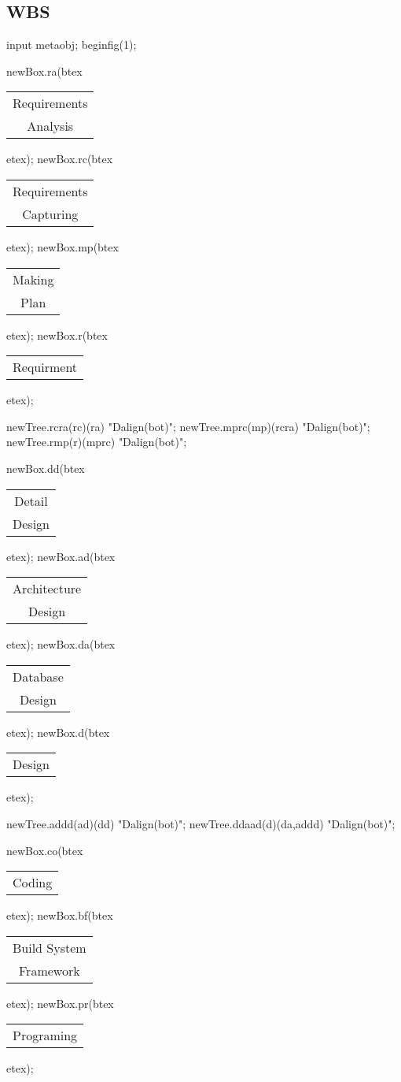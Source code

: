 \documentclass[a4paper,11pt]{article}
\begin{document}
\subsection{WBS}
\begin{center}
\configure[mpggraphic][scale=.75]
\begin{mpdisplay}
input metaobj;
beginfig(1);

newBox.ra(btex \begin{tabular}{@{}c@{}} Requirements\\ Analysis\strut \end{tabular} etex);
newBox.rc(btex \begin{tabular}{@{}c@{}} Requirements\\ Capturing\strut \end{tabular} etex);
newBox.mp(btex \begin{tabular}{@{}c@{}} Making\\ Plan\strut \end{tabular} etex);
newBox.r(btex \begin{tabular}{@{}c@{}} Requirment\strut \end{tabular} etex);

newTree.rcra(rc)(ra) "Dalign(bot)";
newTree.mprc(mp)(rcra) "Dalign(bot)";
newTree.rmp(r)(mprc) "Dalign(bot)";

newBox.dd(btex \begin{tabular}{@{}c@{}} Detail\\ Design\strut \end{tabular} etex);
newBox.ad(btex \begin{tabular}{@{}c@{}} Architecture\\ Design\strut \end{tabular} etex);
newBox.da(btex \begin{tabular}{@{}c@{}} Database\\ Design\strut \end{tabular} etex);
newBox.d(btex \begin{tabular}{@{}c@{}} Design\strut \end{tabular} etex);

newTree.addd(ad)(dd) "Dalign(bot)";
newTree.ddaad(d)(da,addd) "Dalign(bot)";

newBox.co(btex \begin{tabular}{@{}c@{}} Coding\strut \end{tabular} etex);
newBox.bf(btex \begin{tabular}{@{}c@{}} Build System\\ Framework\strut \end{tabular} etex);
newBox.pr(btex \begin{tabular}{@{}c@{}} Programing\strut \end{tabular} etex);


\end{mpdisplay}
\end{center}
\end{document}
